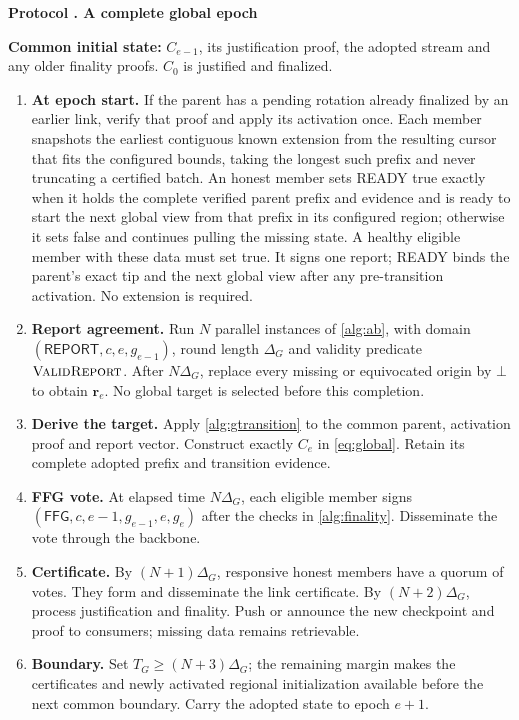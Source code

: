 \documentclass[11pt,a4paper,onecolumn]{article}
\newcommand{\botv}{\bot}
\newcommand{\Tag}[1]{\mathsf{#1}}
\newcommand{\Proc}[1]{\textnormal{\textsc{#1}}}
\theoremstyle{remark}\newtheorem{example}[definition]{Example}
\newcounter{protocol}
\newenvironment{protocol}[2]{\refstepcounter{protocol}\label{#1}\begin{mdframed}[nobreak=true,linewidth=.6pt,skipabove=10pt,skipbelow=10pt,innertopmargin=8pt,innerbottommargin=8pt]\small\raggedright\noindent\textbf{Protocol \theprotocol. #2}\par\smallskip}{\end{mdframed}}
\begin{document}
\begin{protocol}{alg:global}{A complete global epoch}
\textbf{Common initial state:} $C_{e-1}$, its justification proof, the adopted
stream and any older finality proofs. $C_0$ is justified and finalized.
\begin{enumerate}[label=\textbf{G\arabic*.}]
\item \textbf{At epoch start.} If the parent has a pending rotation already
finalized by an earlier link, verify that proof and apply its activation once.
Each member snapshots the earliest contiguous known extension from the resulting
cursor that fits the configured bounds, taking the longest such prefix and
never truncating a certified batch. An honest member sets READY true exactly
when it holds the complete verified parent prefix and evidence and is ready
to start the next global view from that prefix in its configured region;
otherwise it sets false and
continues pulling the missing state. A healthy eligible member with these data
must set true. It signs one report; READY binds the parent's exact tip and
the next global view after any pre-transition activation. No extension is required.
\item \textbf{Report agreement.} Run $N$ parallel instances of
\cref{alg:ab}, with domain $(\Tag{REPORT},c,e,g_{e-1})$, round length $\Delta_G$
and validity predicate $\Proc{ValidReport}$. After $N\Delta_G$, replace every
missing or equivocated origin by $\botv$ to obtain $\mathbf r_e$.
No global target is selected before this completion.
\item \textbf{Derive the target.} Apply \cref{alg:gtransition} to the common
parent, activation proof and report vector. Construct exactly $C_e$ in
\eqref{eq:global}. Retain its complete adopted prefix and transition evidence.
\item \textbf{FFG vote.} At elapsed time $N\Delta_G$, each eligible member
signs $(\Tag{FFG},c,e-1,g_{e-1},e,g_e)$ after the checks in
\cref{alg:finality}. Disseminate the vote through the backbone.
\item \textbf{Certificate.} By $(N+1)\Delta_G$, responsive honest members
have a quorum of votes. They form and disseminate the link certificate.
By $(N+2)\Delta_G$, process justification and finality. Push or announce the
new checkpoint and proof to consumers; missing data remains retrievable.
\item \textbf{Boundary.} Set $T_G\geq(N+3)\Delta_G$; the remaining margin
makes the certificates and newly activated regional initialization available
before the next common boundary. Carry the adopted state to epoch $e+1$.
\end{enumerate}
\end{protocol}
\end{document}
